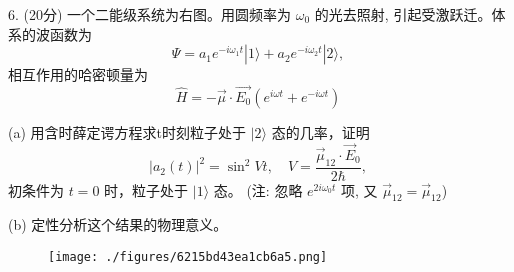 6. (20分) 一个二能级系统为右图。用圆频率为 $\omega_0$ 的光去照射, 引起受激跃迁。体系的波函数为
$$\Psi = a_1 e^{-i \omega_1 t} |1\rangle + a_2 e^{-i \omega_2 t} |2\rangle,~$$
相互作用的哈密顿量为
$$\hat{H} = -\vec\mu \cdot \vec{E_0}(e^{i \omega t} + e^{-i \omega t})~$$

(a) 用含时薛定谔方程求t时刻粒子处于 $|2\rangle$ 态的几率，证明
$$|a_2(t)|^2 = \sin^2 Vt, \quad V = \frac{\vec\mu_{12} \cdot\vec E_0}{2\hbar},~$$
初条件为 $t=0$ 时，粒子处于 $|1\rangle$ 态。 (注: 忽略 $e^{2i\omega_0 t}$ 项, 又 $\vec\mu_{12} =\vec\mu_{12}$)

(b) 定性分析这个结果的物理意义。
\begin{figure}[ht]
\centering
\texttt{[image: ./figures/6215bd43ea1cb6a5.png]}
\caption{} \label{fig_PKU99_1}
\end{figure}